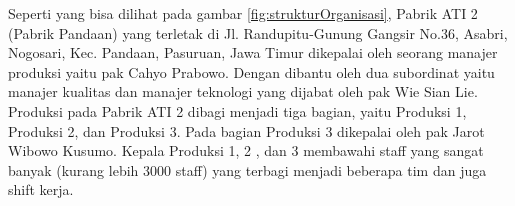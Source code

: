 Seperti yang bisa dilihat pada gambar \ref{fig:strukturOrganisasi}, Pabrik ATI 2 (Pabrik Pandaan) yang terletak di
Jl. Randupitu-Gunung Gangsir No.36, Asabri, Nogosari, Kec. Pandaan, Pasuruan, Jawa Timur dikepalai oleh seorang
manajer produksi yaitu pak Cahyo Prabowo. Dengan dibantu oleh dua subordinat yaitu manajer kualitas dan manajer
teknologi yang dijabat oleh pak Wie Sian Lie. Produksi pada Pabrik ATI 2 dibagi menjadi tiga bagian, yaitu Produksi 1,
Produksi 2, dan Produksi 3. Pada bagian Produksi 3 dikepalai oleh pak Jarot Wibowo Kusumo. Kepala Produksi 1, 2 , dan 3
membawahi staff yang sangat banyak (kurang lebih 3000 staff) yang terbagi menjadi beberapa tim dan juga shift kerja.
\vspace{0.5ex}

